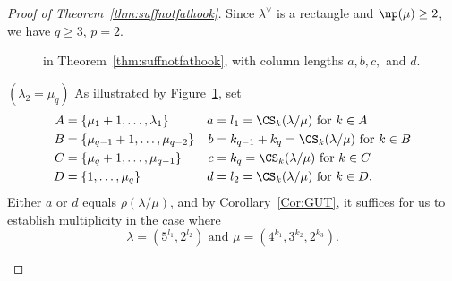 \begin{proof}[Proof of Theorem~\ref{thm:suffnotfathook}] 
Since $\lambda^\vee$ is a rectangle and $\np (\mu) \geq 2$, we have $q\geq 3$, $p=2$.


\begin{figure}[b]\centering
 
 
 \caption[Case 1 in Theorem~\ref{thm:suffnotfathook}, with column lengths $a,b,c,$ and $d$.]{ in Theorem~\ref{thm:suffnotfathook}, with column lengths $a,b,c,$ and $d$.}
 \label{case1necessary} 
\end{figure}



\begin{Case}
{ $(\lambda_2 = \mu_q)$} 
As illustrated by Figure~\ref{case1necessary}, set
\begin{align*}
A & = \{ \mu_1 + 1,\ldots,\lambda_1 \} & a & = l_1 = \CS _k(\lambda / \mu)\text{ for }k \in A \\
B & = \{ \mu_{q-1} + 1,\ldots,\mu_{q-2} \} & b & = k_{q-1} + k_q = \CS _k(\lambda / \mu)\text{ for }k \in B \\
C & = \{ \mu_{q} + 1,\ldots,\mu_{q-1} \} & c & = k_q = \CS _k(\lambda / \mu)\text{ for }k \in C \\
D & = \{ 1,\ldots,\mu_{q} \} & d & = l_2 = \CS _k(\lambda / \mu)\text{ for }k \in D.
\end{align*}
Either $a$ or $d$ equals $\rho(\lambda/\mu)$, and by Corollary~\ref{Cor:GUT}, it suffices for us to establish multiplicity in the case where
\[
\lambda = (5^{l_1},2^{l_2})\text{ and }\mu = (4^{k_1},3^{k_2},2^{k_3}).
\]


\end{Case}
\end{proof}
